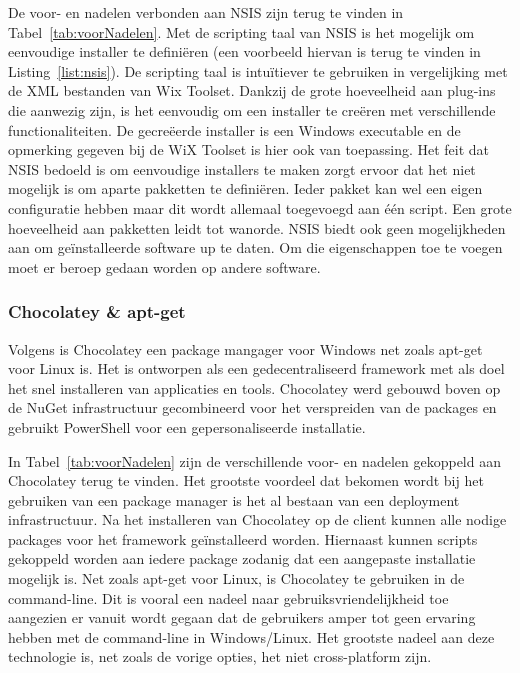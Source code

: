 De voor- en nadelen verbonden aan NSIS zijn terug te vinden in Tabel~\ref{tab:voorNadelen}.
Met de scripting taal van NSIS is het mogelijk om eenvoudige installer te definiëren (een voorbeeld hiervan is terug te vinden in Listing~\ref{list:nsis}).
De scripting taal is intuïtiever te gebruiken in vergelijking met de XML bestanden van Wix Toolset.
Dankzij de grote hoeveelheid aan plug-ins die aanwezig zijn, is het eenvoudig om een installer te creëren met verschillende functionaliteiten.
De gecreëerde installer is een Windows executable en de opmerking gegeven bij de WiX Toolset is hier ook van toepassing.
Het feit dat NSIS bedoeld is om eenvoudige installers te maken zorgt ervoor dat het niet mogelijk is om aparte pakketten te definiëren.
Ieder pakket kan wel een eigen configuratie hebben maar dit wordt allemaal toegevoegd aan één script.
Een grote hoeveelheid aan pakketten leidt tot wanorde.
NSIS biedt ook geen mogelijkheden aan om geïnstalleerde software up te daten.
Om die eigenschappen toe te voegen moet er beroep gedaan worden op andere software.

\subsubsection{Chocolatey \& apt-get}
Volgens \citep{chocoAbout} is Chocolatey een package mangager voor Windows net zoals apt-get voor Linux is.
Het is ontworpen als een gedecentraliseerd framework met als doel het snel installeren van applicaties en tools.
Chocolatey werd gebouwd boven op de NuGet infrastructuur gecombineerd voor het verspreiden van de packages en gebruikt PowerShell voor een gepersonaliseerde installatie.

In Tabel~\ref{tab:voorNadelen} zijn de verschillende voor- en nadelen gekoppeld aan Chocolatey terug te vinden.
Het grootste voordeel dat bekomen wordt bij het gebruiken van een package manager is het al bestaan van een deployment infrastructuur. 
Na het installeren van Chocolatey op de client kunnen alle nodige packages voor het framework geïnstalleerd worden.
Hiernaast kunnen scripts gekoppeld worden aan iedere package zodanig dat een aangepaste installatie mogelijk is.
Net zoals apt-get voor Linux, is Chocolatey te gebruiken in de command-line.
Dit is vooral een nadeel naar gebruiksvriendelijkheid toe aangezien er vanuit wordt gegaan dat de gebruikers amper tot geen ervaring hebben met de command-line in Windows/Linux.
Het grootste nadeel aan deze technologie is, net zoals de vorige opties, het niet cross-platform zijn.


